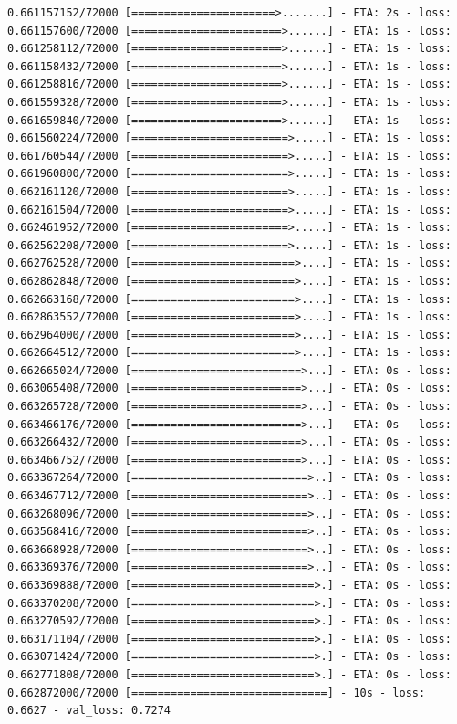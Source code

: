 \documentclass[12pt,fleqn]{article}\usepackage{../../common}
\begin{document}
\begin{verbatim}
0.661157152/72000 [======================>.......] - ETA: 2s - loss: 0.661157600/72000 [=======================>......] - ETA: 1s - loss: 0.661258112/72000 [=======================>......] - ETA: 1s - loss: 0.661158432/72000 [=======================>......] - ETA: 1s - loss: 0.661258816/72000 [=======================>......] - ETA: 1s - loss: 0.661559328/72000 [=======================>......] - ETA: 1s - loss: 0.661659840/72000 [=======================>......] - ETA: 1s - loss: 0.661560224/72000 [========================>.....] - ETA: 1s - loss: 0.661760544/72000 [========================>.....] - ETA: 1s - loss: 0.661960800/72000 [========================>.....] - ETA: 1s - loss: 0.662161120/72000 [========================>.....] - ETA: 1s - loss: 0.662161504/72000 [========================>.....] - ETA: 1s - loss: 0.662461952/72000 [========================>.....] - ETA: 1s - loss: 0.662562208/72000 [========================>.....] - ETA: 1s - loss: 0.662762528/72000 [=========================>....] - ETA: 1s - loss: 0.662862848/72000 [=========================>....] - ETA: 1s - loss: 0.662663168/72000 [=========================>....] - ETA: 1s - loss: 0.662863552/72000 [=========================>....] - ETA: 1s - loss: 0.662964000/72000 [=========================>....] - ETA: 1s - loss: 0.662664512/72000 [=========================>....] - ETA: 1s - loss: 0.662665024/72000 [==========================>...] - ETA: 0s - loss: 0.663065408/72000 [==========================>...] - ETA: 0s - loss: 0.663265728/72000 [==========================>...] - ETA: 0s - loss: 0.663466176/72000 [==========================>...] - ETA: 0s - loss: 0.663266432/72000 [==========================>...] - ETA: 0s - loss: 0.663466752/72000 [==========================>...] - ETA: 0s - loss: 0.663367264/72000 [===========================>..] - ETA: 0s - loss: 0.663467712/72000 [===========================>..] - ETA: 0s - loss: 0.663268096/72000 [===========================>..] - ETA: 0s - loss: 0.663568416/72000 [===========================>..] - ETA: 0s - loss: 0.663668928/72000 [===========================>..] - ETA: 0s - loss: 0.663369376/72000 [===========================>..] - ETA: 0s - loss: 0.663369888/72000 [============================>.] - ETA: 0s - loss: 0.663370208/72000 [============================>.] - ETA: 0s - loss: 0.663270592/72000 [============================>.] - ETA: 0s - loss: 0.663171104/72000 [============================>.] - ETA: 0s - loss: 0.663071424/72000 [============================>.] - ETA: 0s - loss: 0.662771808/72000 [============================>.] - ETA: 0s - loss: 0.662872000/72000 [==============================] - 10s - loss: 0.6627 - val_loss: 0.7274

\end{verbatim}
\end{document}
